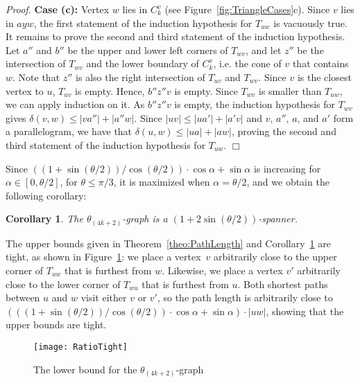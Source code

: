 \documentclass[12pt]{article}
\newtheorem{coro}[defin]{Corollary}
\newenvironment{proof}{\emph{Proof.}}{\hfill $\Box$\\}
\newcommand{\graph}[1]{\ensuremath{\theta_{(4 k + #1)}}-graph\xspace}
\newcommand{\canon}[2]{\ensuremath{T_{#1 #2}}}
\begin{document}
\begin{proof}
  \textbf{Case (c):} Vertex $w$ lies in $C_k^v$ (see Figure~\ref{fig:TriangleCases}c). Since $v$ lies in $a y w$, the first statement of the induction hypothesis for \canon{u}{w} is vacuously true. It remains to prove the second and third statement of the induction hypothesis. Let $a''$ and $b''$ be the upper and lower left corners of \canon{w}{v}, and let $z''$ be the intersection of \canon{w}{v} and the lower boundary of $C_k^v$, i.e. the cone of $v$ that contains $w$. Note that $z''$ is also the right intersection of \canon{u}{v} and \canon{w}{v}. Since $v$ is the closest vertex to $u$, \canon{u}{v} is empty. Hence, $b'' z'' v$ is empty. Since \canon{w}{v} is smaller than \canon{u}{w}, we can apply induction on it. As $b'' z'' v$ is empty, the induction hypothesis for \canon{w}{v} gives $\delta(v, w) \leq |v a''| + |a'' w|$. Since $|u v| \leq |u a'| + |a' v|$ and $v$, $a''$, $a$, and $a'$ form a parallelogram, we have that $\delta(u, w) \leq |u a| + |a w|$, proving the second and third statement of the induction hypothesis for \canon{u}{w}. 
\end{proof}

Since $((1 + \sin(\theta/2)) / \cos(\theta/2)) \cdot \cos \alpha + \sin \alpha$ is increasing for $\alpha \in [0, \theta/2]$, for $\theta \leq \pi/3$, it is maximized when $\alpha = \theta/2$, and we obtain the following corollary: 

\begin{coro}
  \label{cor:SpanningRatio}
  The \graph{2} is a $\left( 1 + 2 \sin \left( \theta/2 \right) \right)$-spanner. 
\end{coro}

The upper bounds given in Theorem~\ref{theo:PathLength} and Corollary~\ref{cor:SpanningRatio} are tight, as shown in Figure~\ref{fig:RatioTight}: we place a vertex~$v$ arbitrarily close to the upper corner of \canon{u}{w} that is furthest from $w$. Likewise, we place a vertex $v'$ arbitrarily close to the lower corner of \canon{w}{u} that is furthest from $u$. Both shortest paths between $u$ and $w$ visit either $v$ or $v'$, so the path length is arbitrarily close to $(((1 + \sin(\theta/2))/\cos(\theta/2)) \cdot \cos \alpha + \sin \alpha) \cdot |u w|$, showing that the upper bounds are tight. 

\begin{figure}[ht]
  \begin{center}
    \texttt{[image: RatioTight]}
  \end{center}
  \caption{The lower bound for the \graph{2}}
  \label{fig:RatioTight}
\end{figure}
\end{document}
